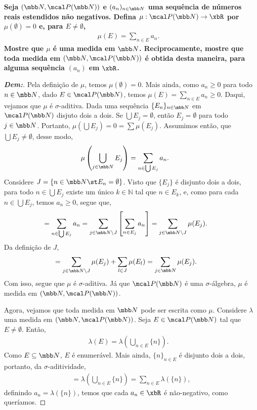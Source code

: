 \biglinend
\newpage 
{}
\bigline
\textbf{Seja $(\mbb N, \mcal P(\mbb N))$ e $(a_n)_{n \in \mbb N}$ uma sequência 
de números reais estendidos não negativos. Defina $\mu: \mcal P(\mbb N) \rightarrow \xbR$
por $\mu(\emptyset) = 0$ e, para $E \neq \emptyset$,
\begin{align*}
  \mu(E) = \sum_{n \in E} a_n.
\end{align*}
Mostre que $\mu$ é uma medida em $\mbb N$. Reciprocamente, mostre que toda medida 
em $(\mbb N, \mcal P(\mbb N))$ é obtida desta maneira, para alguma sequência 
$(a_n)$ em $\xbR$.
}
\begin{proof}[\textbf{Dem:}]
  Pela definição de $\mu$, temos $\mu(\emptyset) = 0$. Mais ainda, como $a_n \ge 0$ para todo $n \in \mbb N$, dado 
  $E \in \mcal P(\mbb N)$, temos
  $\mu(E) = \sum_{n \in E} a_n \ge 0$. Daqui, vejamos que $\mu$ é $\sigma$-aditiva. Dada uma sequência 
  $\{E_n\}_{n \in \mbb N}$ em $\mcal P(\mbb N)$ disjuto dois a dois. Se $\bigcup E_j = \emptyset$, então $E_j = \emptyset$ para todo 
  $j \in \mbb N$. Portanto, $\mu(\bigcup E_j) = 0 = \sum \mu(E_j)$. Assumimos então, que $\bigcup E_j \neq \emptyset$, 
  desse modo,
  \begin{align*}
    \mu\left(\bigcup\limits_{j \in \mbb N} E_j\right) &= \sum_{n \in \bigcup E_j} a_n.
  \end{align*}
  Considere $J = \{n \in \mbb N\st  E_n = \emptyset\}$. Visto que $\{E_j\}$ é disjunto dois a dois,
  para todo $n \in \bigcup E_j$ existe um único $k \in \mathbb N$ tal que 
  $n \in E_k$, e, como para cada $n \in \bigcup E_j$, temos $a_n \ge 0$, segue que,
  \begin{align*}
    &= \sum_{n \in \bigcup E_j} a_n = \sum_{j \in \mbb N \setminus J} \left[\sum_{n \in E_j} a_n\right]
    = \sum_{j \in \mbb N \setminus J} \mu(E_j).
  \end{align*}
  Da definição de $J$, 
\begin{align*}
  &= \sum_{j \in \mbb N \setminus J} \mu(E_j) + \sum_{l \in J}\mu(E_l) = \sum_{j \in \mbb N} \mu(E_j).
\end{align*}
  Com isso, segue que $\mu$ é $\sigma$-aditiva. Já que $\mcal P (\mbb N)$ é uma $\sigma$-álgebra, $\mu$ é medida em 
  $(\mbb N, \mcal P (\mbb N))$.

  Agora, vejamos que toda medida em $\mbb N$ pode ser escrita como $\mu$. Considere $\lambda$ 
  uma medida em $(\mbb N, \mcal P (\mbb N))$. Seja $E \in \mcal P (\mbb N)$ tal que $E \neq \emptyset$.
  Então, 
  \begin{align*}
    \lambda(E) = \lambda\left(\bigcup\limits_{n \in E} \{n\}\right).
  \end{align*}
  Como $E \subseteq \mbb N$, $E$ é enumerável. Mais ainda, $\{n\}_{n \in E}$ é disjunto dois a dois, portanto, 
  da $\sigma$-aditividade, 
  \begin{align*}
    &= \lambda\left(\bigcup\limits_{n \in E} \{n\}\right) = \sum_{n \in E} \lambda(\{n\}),
  \end{align*}
  definindo $a_n = \lambda(\{n\})$, temos que cada $a_n \in \xbR$ é não-negativo, 
  como queríamos.
\end{proof}

